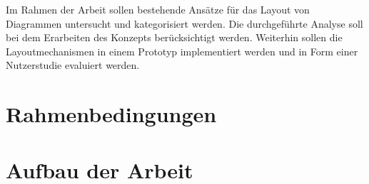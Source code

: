 
Im Rahmen der Arbeit sollen bestehende Ansätze für das Layout von Diagrammen untersucht und kategorisiert werden. Die durchgeführte Analyse soll bei dem Erarbeiten des Konzepts berücksichtigt werden. Weiterhin sollen die Layoutmechanismen in einem Prototyp implementiert werden und in Form einer Nutzerstudie evaluiert werden.


\section{Rahmenbedingungen}
\label{sec:conditions}


\section{Aufbau der Arbeit}















